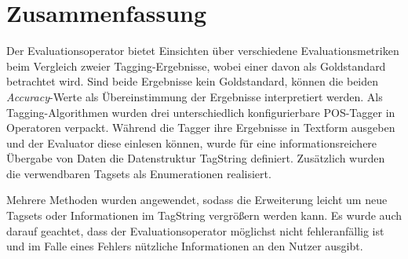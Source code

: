 \section{Zusammenfassung}
\label{sec:system:conclusion}

Der Evaluationsoperator bietet Einsichten über verschiedene Evaluationsmetriken beim Vergleich zweier Tagging-Ergebnisse, wobei einer davon als Goldstandard betrachtet wird. Sind beide Ergebnisse kein Goldstandard, können die beiden \textit{Accuracy}-Werte als Übereinstimmung der Ergebnisse interpretiert werden. Als Tagging-Algorithmen wurden drei unterschiedlich konfigurierbare POS-Tagger in Operatoren verpackt. Während die Tagger ihre Ergebnisse in Textform ausgeben und der Evaluator diese einlesen können, wurde für eine informationsreichere Übergabe von Daten die Datenstruktur TagString definiert. Zusätzlich wurden die verwendbaren Tagsets als Enumerationen realisiert.

Mehrere Methoden wurden angewendet, sodass die Erweiterung leicht um neue Tagsets oder Informationen im TagString vergrößern werden kann. Es wurde auch darauf geachtet, dass der Evaluationsoperator möglichst nicht fehleranfällig ist und im Falle eines Fehlers nützliche Informationen an den Nutzer ausgibt.